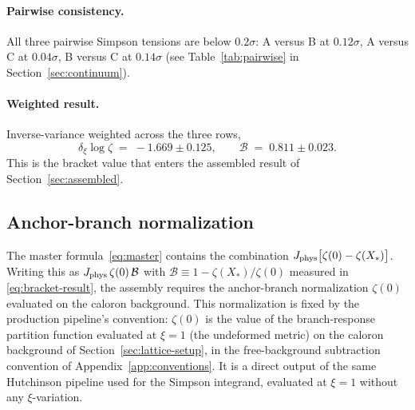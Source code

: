 \documentclass[a4paper,11pt]{article}
\theoremstyle{definition}
\newcommand{\Jphys}{J_{\rm phys}}
\newcommand{\Bobs}{\mathcal{B}}
\begin{document}
\paragraph{Pairwise consistency.}
All three pairwise Simpson tensions are below $0.2\sigma$: A versus
B at $0.12\sigma$, A versus C at $0.04\sigma$, B versus C at
$0.14\sigma$ (see Table~\ref{tab:pairwise} in
Section~\ref{sec:continuum}).

\paragraph{Weighted result.}
Inverse-variance weighted across the three rows,
\begin{equation}
\delta_\xi \log\zeta \;=\; -1.669 \pm 0.125,
\qquad
\Bobs \;=\; 0.811 \pm 0.023.
\label{eq:bracket-result}
\end{equation}
This is the bracket value that enters the assembled result of
Section~\ref{sec:assembled}.

\subsection{Anchor-branch normalization}
\label{subsec:zeta-normalization}

The master formula~\eqref{eq:master} contains the combination
$\Jphys\bigl[\zeta(0) - \zeta(X_*)\bigr]$. Writing this as
$\Jphys\,\zeta(0)\,\Bobs$ with
$\Bobs \equiv 1 - \zeta(X_*)/\zeta(0)$ measured in
\eqref{eq:bracket-result}, the assembly requires the anchor-branch
normalization $\zeta(0)$ evaluated on the caloron background. This
normalization is fixed by the production pipeline's convention:
$\zeta(0)$ is the value of the branch-response partition function
evaluated at $\xi = 1$ (the undeformed metric) on the caloron
background of Section~\ref{sec:lattice-setup}, in the free-background
subtraction convention of Appendix~\ref{app:conventions}. It is a
direct output of the same Hutchinson pipeline used for the Simpson
integrand, evaluated at $\xi = 1$ without any $\xi$-variation.
\end{document}
